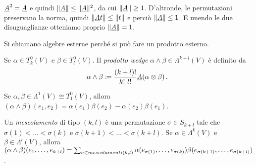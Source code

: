\begin{remark}
	$\antisimm^2=\antisimm$ e quindi $\norm\antisimm \le \norm\antisimm^2$, da cui $\norm\antisimm \ge 1 $.
	D'altronde, le permutazioni preservano la norma, quindi $\norm{\antisimm t} \le \norm{t}$ e perciò $\norm \antisimm \le 1$.
	E unendo le due disuguaglianze otteniamo proprio $\norm\antisimm = 1$.
\end{remark}

Si chiamano algebre esterne perché si può fare un prodotto esterno.

\begin{definition}
	Se $\alpha \in T^0_k(V)$ e $\beta \in T^0_l(V)$. Il \emph{prodotto wedge} $\alpha \wedge \beta \in \Lambda^{k+l}(V)$ è definito da
	\begin{equation*}
		\alpha\wedge \beta \coloneqq \frac {(k+l)!}{k!\ l!} \antisimm(\alpha\otimes \beta)\punto
	\end{equation*}
\end{definition}

\begin{example}
	Se $\alpha,\beta\in\Lambda^1(V) \cong T^0_1(V)$, allora $(\alpha\wedge \beta)(e_1,e_2) = \alpha(e_1)\beta(e_2) - \alpha(e_2)\beta(e_1)$.
\end{example}

\begin{exercise}
	Un \emph{mescolamento} di tipo $(k,l)$ è una permutazione $\sigma \in S_{k+l}$ tale che $\sigma(1) < \ldots < \sigma(k)$ e $\sigma(k+1) <\ldots < \sigma(k+l)$.
	Se $\alpha\in\Lambda^k(V)$ e $\beta\in\Lambda^l(V)$, allora $(\alpha\wedge\beta)(\seqb{e}{k+l}{,}) = \sum_{\sigma \in mescolamenti(k,l)} \alpha(e_{\sigma(1)},\ldots,e_{\sigma(k)}) \beta(e_{\sigma(k+1)},\ldots,e_{\sigma(k+l)})$.
\end{exercise}

